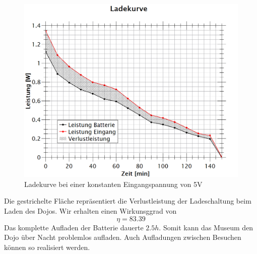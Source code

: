 \begin{figure}[h]
	\centering
	\includegraphics[width=\textwidth]{graphics/ladekurve.png}
	\caption{Ladekurve bei einer konstanten Eingangspannung von 5V}
	\label{fig:Ladeleistung}
\end{figure}

Die gestrichelte Fläche repräsentiert die Verlustleistung der Ladeschaltung beim Laden des Dojos.
Wir erhalten einen Wirkunsggrad von
\begin{equation}
\eta = 83.39%
\end{equation}
Das komplette Aufladen der Batterie dauerte $2.5h$. Somit kann das Museum den Dojo über Nacht problemlos aufladen. Auch Aufladungen zwischen Besuchen können so realisiert werden.